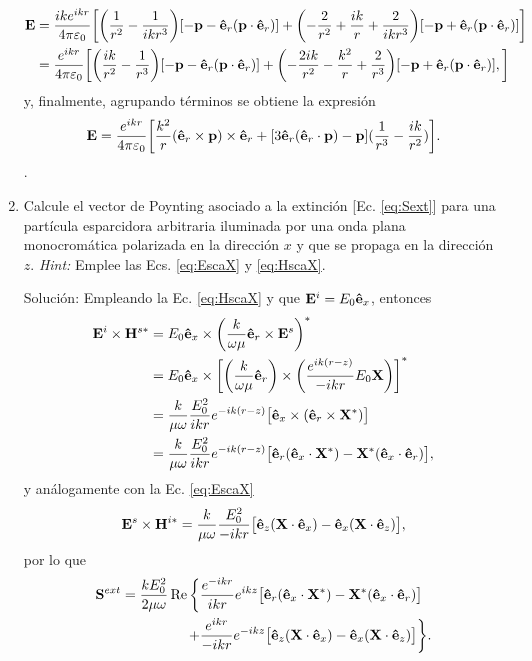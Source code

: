 \begin{enumerate}[label=\textbf{Ejercicio \thechapter.\arabic*},resume]
\begin{align*}
\vb{E} &= \frac{ik e^{ikr}}{4\pi\varepsilon_0}\qty[
	\qty(\frac{1}{r^2}-\frac{1}{ikr^3})[-\vb{p}-\vu{e}_r(\vb{p}\cdot\vu{e}_r)] + 
	\qty(-\frac{2}{r^2}+\frac{ik}{r}+\frac{2}{ikr^3})[-\vb{p}+\vu{e}_r(\vb{p}\cdot\vu{e}_r)]
]\\
	&=  \frac{e^{ikr}}{4\pi\varepsilon_0}\qty[
	\qty(\frac{ik}{r^2}-\frac{1}{r^3})[-\vb{p}-\vu{e}_r(\vb{p}\cdot\vu{e}_r)] + 
	\qty(-\frac{2ik}{r^2}-\frac{k^2}{r}+\frac{2}{r^3})[-\vb{p}+\vu{e}_r(\vb{p}\cdot\vu{e}_r)],
]
\end{align*}
%
y, finalmente, agrupando términos se obtiene la expresión
%
\begin{align*}
\vb{E} = \frac{e^{ikr}}{4\pi\varepsilon_0}\qty[
	\frac{k^2}{r}(\vu{e}_r\times\vb{p})\times\vu{e}_r + 
	[3\vu{e}_r(\vu{e}_r\cdot\vb{p})-\vb{p}](\frac{1}{r^3}-\frac{ik}{r^2})
].
\end{align*}.
%

\item Calcule el vector de Poynting asociado a la extinción [Ec. \eqref{eq:Sext}] para una partícula esparcidora arbitraria iluminada por una onda plana monocromática polarizada en la dirección $x$ y que se propaga en la dirección $z$.
\textit{Hint:} Emplee las Ecs. \eqref{eq:EscaX} y \eqref{eq:HscaX}.
\label{ex:Wext}
\item[\color{blue} Solución:]
Empleando la Ec. \eqref{eq:HscaX} y que $\vb{E}^i = E_0\vu{e}_x$, entonces
%
\begin{align*}
\vb{E}^i\times\vb{H}^{s*} &= E_0\vu{e}_x\times\qty(\frac{k}{\omega\mu}\vu{e}_r\times\vb{E}^s)^*\\
	&= E_0 \vu{e}_x\times\qty[\qty(\frac{k}{\omega\mu}\vu{e}_r)\times\qty(\frac{e^{ik(r-z)}}{-ikr}E_0\vb{X})]^*\\
	&= \frac{k}{\mu\omega}\frac{E_0^2}{ikr}e^{-ik(r-z)}\big[\vu{e}_x\times(\vu{e}_r\times\vb{X}^*)\big]\\
&= \frac{k}{\mu\omega}\frac{E_0^2}{ikr}e^{-ik(r-z)}
	\big[
	\vu{e}_r(\vu{e}_x\cdot\vb{X}^*)-\vb{X}^*(\vu{e}_x\cdot\vu{e}_r)\big],
\end{align*}
%
y análogamente con la Ec. \eqref{eq:EscaX}
%
\begin{align*}
\vb{E}^s\times\vb{H}^{i*} = \frac{k}{\mu\omega} \frac{E_0^2}{-ikr}\big[
	\vu{e}_z(\vb{X}\cdot\vu{e}_x)-\vu{e}_x(\vb{X}\cdot\vu{e}_z)\big],
\end{align*}
%
por lo que
%
\begin{align*}
\vb{S}^{ext} = \frac{kE_0^2}{2\mu\omega}\Re\bigg\{&
\frac{e^{-ikr}}{ikr}e^{ikz}
	\big[
	\vu{e}_r(\vu{e}_x\cdot\vb{X}^*)-\vb{X}^*(\vu{e}_x\cdot\vu{e}_r)		
	\big]\\
+&
\frac{e^{ikr}}{-ikr}e^{-ikz}
	\big[
	\vu{e}_z(\vb{X}\cdot\vu{e}_x)-\vu{e}_x(\vb{X}\cdot\vu{e}_z)
	\big]
\bigg\}.
\end{align*}
%


\end{enumerate}
